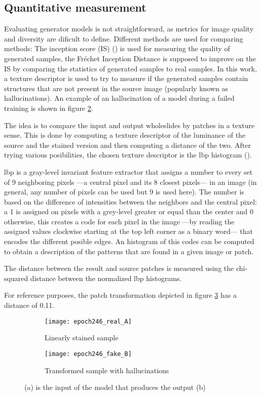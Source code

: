 \documentclass[../main.tex]{subfiles}
\begin{document}
\subsection{Quantitative measurement}
Evaluating generator models is not straightforward, as metrics for image
quality and diversity are dificult to define. Different methods are used
for comparing methods: The inception score (IS)
(\cite{DBLP:journals/corr/SalimansGZCRC16}) is used for measuring the quality
of generated samples, the Fréchet Inception Distance is supposed to improve on
the IS by comparing the statistics of generated samples to real samples.
In this work, a texture descriptor is used to try to measure if the generated
samples contain structures that are not present in the source image
(popularly known as hallucinations). An example of an hallucination of a 
model during a failed training is shown in figure \ref{fig:hallucination_B}.

The idea is to compare the input and output wholeslides by patches in a
texture sense. This is done by computing a texture descriptor of the luminance
of the source and the stained version and then computing a distance of the two.
After trying various posibilities, the chosen texture descriptor is the
\gls{lbp} histogram (\cite{lbp}).

\gls{lbp} is a gray-level invariant feature extractor that assigns a number
to every set of 9 neighboring pixels ---a central pixel and its 8
closest pixels--- in an image (in general, any number of pixels can be used but
9 is used here). The number is based on the difference of intensities between
the neighbors and the central pixel: a 1 is assigned on pixels with a grey-level
greater or equal than the center and 0 otherwise, this creates a code for each
pixel in the image ---by reading the assigned values clockwise starting at the
top left corner as a binary word--- that encodes the different posible edges.
An histogram of this codes can be computed
to obtain a description of the patterns that are found in a given image or patch.

The distance between the result and source patches is measured using
the chi-squared distance between the normalized \gls{lbp} histograms.

For reference purposes, the patch transformation depicted in figure
\ref{fig:hallucination} has a distance of 0.11.

\begin{figure}[h]
\centering
\begin{subfigure}{.5\textwidth}
  \centering
  \texttt{[image: epoch246\_real\_A]}
  \caption{Linearly stained sample}
  \label{fig:hallucination_A}
\end{subfigure}%
\begin{subfigure}{.5\textwidth}
  \centering
  \texttt{[image: epoch246\_fake\_B]}
  \caption{Transformed sample with hallucinations}
  \label{fig:hallucination_B}
\end{subfigure}
\caption{(a) is the input of the model that produces the output (b)}
\label{fig:hallucination}
\end{figure}
\end{document}
